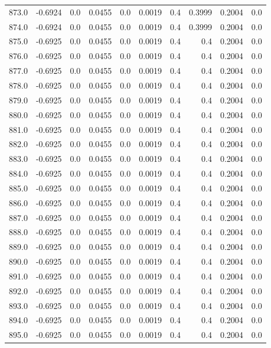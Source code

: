 \begin{longtable}{lrrrrrrrrr}
873.0 & -0.6924 & 0.0 & 0.0455 & 0.0 & 0.0019 & 0.4 & 0.3999 & 0.2004 & 0.0 \\
874.0 & -0.6924 & 0.0 & 0.0455 & 0.0 & 0.0019 & 0.4 & 0.3999 & 0.2004 & 0.0 \\
875.0 & -0.6925 & 0.0 & 0.0455 & 0.0 & 0.0019 & 0.4 & 0.4 & 0.2004 & 0.0 \\
876.0 & -0.6925 & 0.0 & 0.0455 & 0.0 & 0.0019 & 0.4 & 0.4 & 0.2004 & 0.0 \\
877.0 & -0.6925 & 0.0 & 0.0455 & 0.0 & 0.0019 & 0.4 & 0.4 & 0.2004 & 0.0 \\
878.0 & -0.6925 & 0.0 & 0.0455 & 0.0 & 0.0019 & 0.4 & 0.4 & 0.2004 & 0.0 \\
879.0 & -0.6925 & 0.0 & 0.0455 & 0.0 & 0.0019 & 0.4 & 0.4 & 0.2004 & 0.0 \\
880.0 & -0.6925 & 0.0 & 0.0455 & 0.0 & 0.0019 & 0.4 & 0.4 & 0.2004 & 0.0 \\
881.0 & -0.6925 & 0.0 & 0.0455 & 0.0 & 0.0019 & 0.4 & 0.4 & 0.2004 & 0.0 \\
882.0 & -0.6925 & 0.0 & 0.0455 & 0.0 & 0.0019 & 0.4 & 0.4 & 0.2004 & 0.0 \\
883.0 & -0.6925 & 0.0 & 0.0455 & 0.0 & 0.0019 & 0.4 & 0.4 & 0.2004 & 0.0 \\
884.0 & -0.6925 & 0.0 & 0.0455 & 0.0 & 0.0019 & 0.4 & 0.4 & 0.2004 & 0.0 \\
885.0 & -0.6925 & 0.0 & 0.0455 & 0.0 & 0.0019 & 0.4 & 0.4 & 0.2004 & 0.0 \\
886.0 & -0.6925 & 0.0 & 0.0455 & 0.0 & 0.0019 & 0.4 & 0.4 & 0.2004 & 0.0 \\
887.0 & -0.6925 & 0.0 & 0.0455 & 0.0 & 0.0019 & 0.4 & 0.4 & 0.2004 & 0.0 \\
888.0 & -0.6925 & 0.0 & 0.0455 & 0.0 & 0.0019 & 0.4 & 0.4 & 0.2004 & 0.0 \\
889.0 & -0.6925 & 0.0 & 0.0455 & 0.0 & 0.0019 & 0.4 & 0.4 & 0.2004 & 0.0 \\
890.0 & -0.6925 & 0.0 & 0.0455 & 0.0 & 0.0019 & 0.4 & 0.4 & 0.2004 & 0.0 \\
891.0 & -0.6925 & 0.0 & 0.0455 & 0.0 & 0.0019 & 0.4 & 0.4 & 0.2004 & 0.0 \\
892.0 & -0.6925 & 0.0 & 0.0455 & 0.0 & 0.0019 & 0.4 & 0.4 & 0.2004 & 0.0 \\
893.0 & -0.6925 & 0.0 & 0.0455 & 0.0 & 0.0019 & 0.4 & 0.4 & 0.2004 & 0.0 \\
894.0 & -0.6925 & 0.0 & 0.0455 & 0.0 & 0.0019 & 0.4 & 0.4 & 0.2004 & 0.0 \\
895.0 & -0.6925 & 0.0 & 0.0455 & 0.0 & 0.0019 & 0.4 & 0.4 & 0.2004 & 0.0 \\

\end{longtable}
